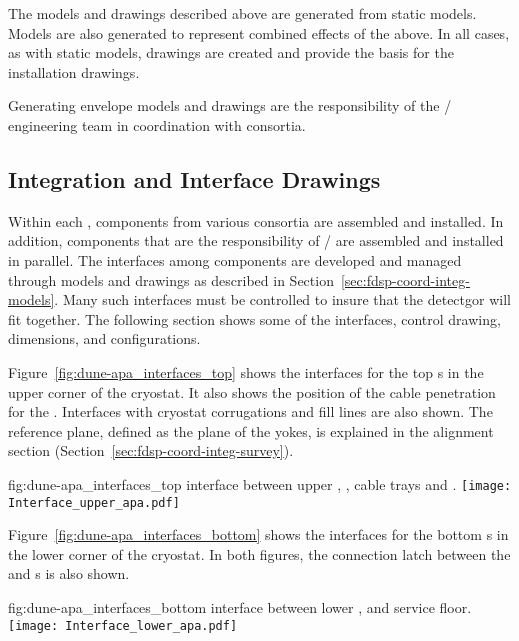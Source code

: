The models and drawings described above are generated from static
models. Models are also generated to represent combined effects of the
above. In all cases, as with static models, \twod drawings are created
and provide the basis for the installation drawings.


Generating envelope models and drawings are the responsibility of the
/ engineering team in coordination with consortia.


\subsection{Integration and Interface Drawings}
\label{sec:fdsp-coord-integ-drawings}

Within each , components from various consortia are
assembled and installed. In addition, components that are the
responsibility of / are assembled and installed in
parallel. The interfaces among components are developed and managed
through models and drawings as described in
Section~\ref{sec:fdsp-coord-integ-models}. Many such interfaces must
be controlled to insure that the detectgor will fit together. The
following section shows some of the interfaces, control drawing,
dimensions, and configurations.


Figure~\ref{fig:dune-apa_interfaces_top} shows the interfaces for the
top s in the upper corner of the cryostat. It also shows the position
of the cable penetration for the . Interfaces with cryostat
corrugations and  fill lines are also shown. The reference plane,
defined as the plane of the  yokes, is explained in the
alignment section (Section~\ref{sec:fdsp-coord-integ-survey}).
\begin{dunefigure}{fig:dune-apa_interfaces_top}
  { interface between upper , , cable
    trays and .}
  \texttt{[image: Interface\_upper\_apa.pdf]}
\end{dunefigure}


Figure~\ref{fig:dune-apa_interfaces_bottom} shows the interfaces for
the bottom s in the lower corner of the cryostat. In both figures,
the connection latch between the  and s is also
shown.
\begin{dunefigure}{fig:dune-apa_interfaces_bottom}
  { interface between lower ,  and 
    service floor.}
  \texttt{[image: Interface\_lower\_apa.pdf]}
\end{dunefigure}


